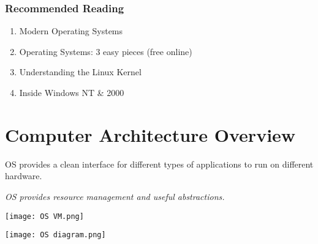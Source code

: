 \documentclass{report}
\begin{document}
\subsubsection*{Recommended Reading}
\begin{enumerate}
	\item Modern Operating Systems
	\item Operating Systems: 3 easy pieces (free online)
	\item Understanding the Linux Kernel
	\item Inside Windows NT \& 2000
\end{enumerate}

\section*{Computer Architecture Overview}
OS provides a clean interface for different types of applications to run on different hardware.
\\ \centerline{\textit{OS provides resource management and useful abstractions.}}
\begin{center}
	\texttt{[image: OS VM.png]} \\
\end{center}
\begin{center}
	\texttt{[image: OS diagram.png]}
\end{center}
\end{document}
